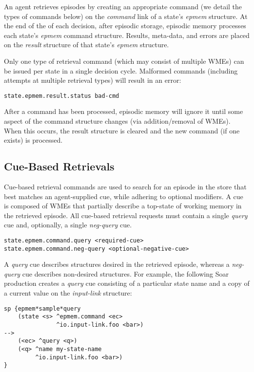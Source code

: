 An agent retrieves episodes by creating an appropriate command (we detail the types of commands below) on the \emph{command} link of a state's \emph{epmem} structure. At the end of the  of each decision, after episodic storage, episodic memory processes each state's \emph{epmem} command structure.  Results, meta-data, and errors are placed on the \emph{result} structure of that state's \emph{epmem} structure.

Only one type of retrieval command (which may consist of multiple WMEs) can be issued per state in a single decision cycle.  Malformed commands (including attempts at multiple retrieval types) will result in an error:

\begin{verbatim}
state.epmem.result.status bad-cmd
\end{verbatim}

After a command has been processed, episodic memory will ignore it until some aspect of the command structure changes (via addition/removal of WMEs).  When this occurs, the result structure is cleared and the new command (if one exists) is processed.

\subsection{Cue-Based Retrievals}
Cue-based retrieval commands are used to search for an episode in the store that best matches an agent-supplied cue, while adhering to optional modifiers.  A cue is composed of WMEs that partially describe a top-state of working memory in the retrieved episode.  All cue-based retrieval requests must contain a single \emph{query} cue and, optionally, a single \emph{neg-query} cue.  

\begin{verbatim}
state.epmem.command.query <required-cue>
state.epmem.command.neg-query <optional-negative-cue>
\end{verbatim}

A \emph{query} cue describes structures desired in the retrieved episode, whereas a \emph{neg-query} cue describes non-desired structures.  For example, the following Soar production creates a \emph{query} cue consisting of a particular state name and a copy of a current value on the \emph{input-link} structure:

\begin{verbatim}
sp {epmem*sample*query
    (state <s> ^epmem.command <ec>
               ^io.input-link.foo <bar>)
-->
    (<ec> ^query <q>)
    (<q> ^name my-state-name
         ^io.input-link.foo <bar>)
}
\end{verbatim}

